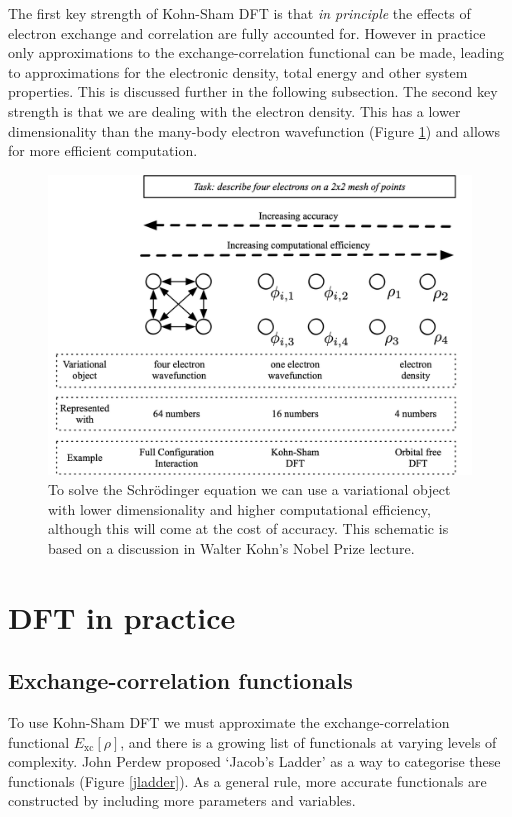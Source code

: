 The first key strength of Kohn-Sham DFT is that \textit{in principle} the effects of electron exchange and correlation are fully accounted for. However in practice only approximations to the exchange-correlation functional can be made, leading to approximations for the electronic density, total energy and other system properties. This is discussed further in the following subsection.
The second key strength is that we are dealing with the electron density. This has a lower dimensionality than the many-body electron wavefunction (Figure \ref{dimensions}) and allows for more efficient computation.\autocite{Perdew2010,Kohn1999} 


\begin{figure}[h]
\centering
  \includegraphics[width=0.8\columnwidth]{figures/ch3/dimensions.png}
  \caption[Dimensionality of variational objects]{To solve the Schr\"{o}dinger equation we can use a variational object with lower dimensionality and higher computational efficiency, although this will come at the cost of accuracy. This schematic is based on a discussion in Walter Kohn's Nobel Prize lecture.\autocite{Kohn1999}}
  \label{dimensions}
\end{figure}


\section{DFT in practice}

\subsection{Exchange-correlation functionals}
To use Kohn-Sham DFT we must approximate the exchange-correlation functional $E_{\textrm{xc}}\left[\rho\right]$, and there is a growing list of functionals at varying levels of complexity. John Perdew proposed `Jacob's Ladder' as a way to categorise these functionals (Figure \ref{jladder}). As a general rule, more accurate functionals are constructed by including more parameters and variables.

